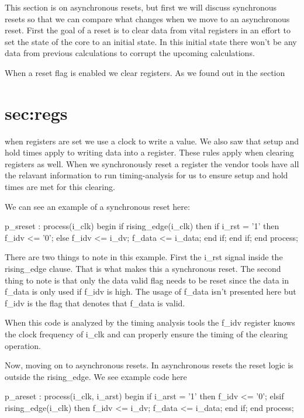 This section is on asynchronous resets, but first we will discuss synchronous resets so that we can compare what changes when we move to an asynchronous reset. First the goal of a reset is to clear data from vital registers in an effort to set the state of the core to an initial state. In this initial state there won't be any data from previous calculations to corrupt the upcoming calculations. 

When a reset flag is enabled we clear registers. As we found out in the section \section{sec:regs} when registers are set we use a clock to write a value. We also saw that setup and hold times apply to writing data into a register. These rules apply when clearing registers as well. When we synchronously reset a register the vendor tools have all the relavant information to run timing-analysis for us to ensure setup and hold times are met for this clearing. 

We can see an example of a synchronous reset here:

\begin{VHDLlisting}[tabsize=4]
p_sreset : process(i_clk)
begin
	if rising_edge(i_clk) then
		if i_rst = '1' then
			f_idv <= '0';
		else
			f_idv <= i_dv;
			f_data <= i_data;		
		end if;	
	end if;
end process;
\end{VHDLlisting}

There are two things to note in this example. First the i\_rst signal inside the rising\_edge clause. That is what makes this a synchronous reset. The second thing to note is that only the data valid flag needs to be reset since the data in f\_data is only used if f\_idv is high. The usage of f\_data isn't presented here but f\_idv is the flag that denotes that f\_data is valid. 

When this code is analyzed by the timing analysis tools the f\_idv register knows the clock frequency of i\_clk and can properly ensure the timing of the clearing operation. 

Now, moving on to asynchronous resets. In asynchronous resets the reset logic is outside the rising\_edge. We see example code here

\begin{VHDLlisting}[tabsize=4]
p_areset : process(i_clk, i_arst)
begin
	if i_arst = '1' then
		f_idv <= '0';
	elsif rising_edge(i_clk) then
		f_idv <= i_dv;
		f_data <= i_data;		
	end if;
end process;
\end{VHDLlisting}

